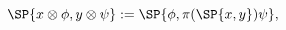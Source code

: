 \begin{equation}
    \label{eq:indInnPro}
    \SP{x \otimes \phi, y \otimes \psi} 
    := \SP{\phi, \pi(\SP{x,y})\psi},
\end{equation}

